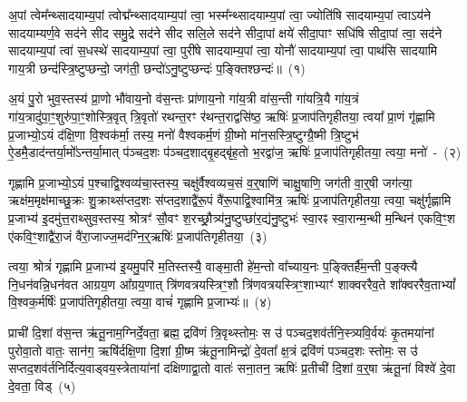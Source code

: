 \setcounter{anuvakam}{0}
अ॒पां त्वेम᳚न्थ्सादयाम्य॒पां त्वोद्म᳚न्थ्सादयाम्य॒पां त्वा॒ भस्म᳚न्थ्सादयाम्य॒पां त्वा॒ ज्योति॑षि सादयाम्य॒पां त्वाऽय॑ने सादयाम्यर्ण॒वे सद॑ने सीद समु॒द्रे सद॑ने सीद सलि॒ले सद॑ने सीदा॒पां क्षये॑ सीदा॒पाꣳ सधि॑षि सीदा॒पां त्वा॒ सद॑ने सादयाम्य॒पां त्वा॑ स॒धस्थे॑ सादयाम्य॒पां त्वा॒ पुरी॑षे सादयाम्य॒पां त्वा॒ योनौ॑ सादयाम्य॒पां त्वा॒ पाथ॑सि सादयामि गाय॒त्री छन्द॑स्त्रि॒ष्टुप्छन्दो॒ जग॑ती॒ छन्दो॑\-ऽनु॒ष्टुप्छन्दः॑ प॒ङ्क्तिश्छन्दः॑॥~(१)\ip

{\anuvakamend[{योनौ॒ पञ्च॑दश च}]}

अ॒यं पु॒रो भुव॒स्तस्य॑ प्रा॒णो भौ॑वाय॒नो व॑स॒न्तः प्रा॑णाय॒नो गा॑य॒त्री वा॑स॒न्ती गा॑यत्रि॒यै गा॑य॒त्रं गा॑य॒त्रादु॑पा॒ꣳ॒शु\-रु॑पा॒ꣳ॒शोस्त्रि॒वृत् त्रि॒वृतो॑ रथन्त॒रꣳ र॑थन्त॒राद्वसि॑ष्ठ॒ ऋषिः॑ प्र॒जा\-प॑तिगृहीतया॒ त्वया᳚ प्रा॒णं गृ॑ह्णामि प्र॒जाभ्यो॒\-ऽयं द॑क्षि॒णा वि॒श्वक॑र्मा॒ तस्य॒ मनो॑ वैश्वकर्म॒णं ग्री॒ष्मो मा॑न॒सस्त्रि॒ष्टुग्ग्रै॒ष्मी त्रि॒ष्टुभ॑ ऐ॒डमै॒डाद॑न्तर्या॒मो᳚\-ऽन्तर्या॒मात् प॑ञ्चद॒शः प॑ञ्चद॒शाद्बृ॒हद्बृ॑ह॒तो भ॒रद्वा॑ज॒ ऋषिः॑ प्र॒जा\-प॑तिगृहीतया॒ त्वया॒ मनो॑~-~(२)\ip

गृह्णामि प्र॒जाभ्यो॒\-ऽयं प॒श्चाद्वि॒श्वव्य॑चा॒स्तस्य॒ चक्षु॑र्वैश्वव्यच॒सं व॒र्॒\mbox{}षाणि॑ चाक्षु॒षाणि॒ जग॑ती वा॒र्॒\mbox{}षी जग॑त्या॒ ऋक्ष॑म॒मृक्ष॑माच्छु॒क्रः शु॒क्राथ्स॑प्तद॒शः स॑प्तद॒शाद्वै॑रू॒पं वै॑रू॒पाद्वि॒श्वामि॑त्र॒ ऋषिः॑ प्र॒जा\-प॑तिगृहीतया॒ त्वया॒ चक्षु॑र्गृह्णामि प्र॒जाभ्य॑ इ॒दमु॑त्त॒राथ्सुव॒स्तस्य॒ श्रोत्रꣳ॑ सौ॒वꣳ श॒रच्छ्रौ॒त्र्य॑नु॒ष्टुप्छा॑र॒द्य॑नु॒ष्टुभः॑ स्वा॒रꣴ स्वा॒रान्म॒न्थी म॒न्थिन॑ एकवि॒ꣳ॒श ए॑कवि॒ꣳ॒शाद्वै॑रा॒जं वै॑रा॒जाज्ज॒मद॑ग्नि॒र्॒\mbox{}ऋषिः॑ प्र॒जा\-प॑तिगृहीतया॒~(३)\ip

त्वया॒ श्रोत्रं॑ गृह्णामि प्र॒जाभ्य॑ इ॒यमु॒परि॑ म॒तिस्तस्यै॒ वाङ्मा॒ती हे॑म॒न्तो वा᳚च्याय॒नः प॒ङ्क्तिर्\mbox{}है॑म॒न्ती प॒ङ्क्त्यै नि॒धन॑वन्नि॒धन॑वत आग्रय॒ण आ᳚ग्रय॒णात् त्रि॑णवत्रयस्त्रिꣳ॒शौ त्रि॑णवत्रयस्त्रिꣳ॒शाभ्याꣳ॑ शाक्वररैव॒ते शा᳚क्वररैव॒ता\-भ्यां᳚ वि॒श्वक॒र्मर्\mbox{}षिः॑ प्र॒जा\-प॑तिगृहीतया॒ त्वया॒ वाचं॑ गृह्णामि प्र॒जाभ्यः॑॥~(४)\ip

{\anuvakamend[{त्वया॒ मनो॑ ज॒मद॑ग्नि॒र्॒\mbox{}ऋषिः॑ प्र॒जा\-प॑तिगृहीतया त्रि॒ꣳ॒शच्च॑}]}

प्राची॑ दि॒शां व॑स॒न्त ऋ॑तू॒नाम॒ग्निर्दे॒वता॒ ब्रह्म॒ द्रवि॑णं त्रि॒वृथ्स्तोमः॒ स उ॑ पञ्चद॒शव॑र्तनि॒स्त्र्यवि॒र्वयः॑ कृ॒तमया॑नां पुरोवा॒तो वातः॒ सान॑ग॒ ऋषि॑र्दक्षि॒णा दि॒शां ग्री॒ष्म ऋ॑तू॒नामिन्द्रो॑ दे॒वता᳚ क्ष॒त्रं द्रवि॑णं पञ्चद॒शः स्तोमः॒ स उ॑ सप्तद॒शव॑र्तनिर्दित्य॒वाड्वय॒स्त्रेताया॑नां दक्षिणाद्वा॒तो वातः॑ सना॒तन॒ ऋषिः॑ प्र॒तीची॑ दि॒शां व॒र्॒\mbox{}षा ऋ॑तू॒नां विश्वे॑ दे॒वा दे॒वता॒ विड्~(५)\ip

